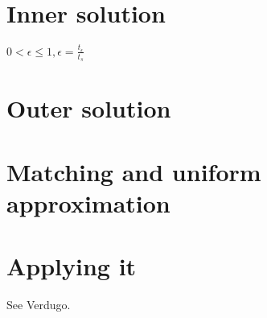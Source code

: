 \documentclass[12pt]{report}
\begin{document}
\section{Inner solution}

$0 < \epsilon \leq 1, \epsilon = \frac{t_{\epsilon}}{t_{s}}$

\section{Outer solution}

\section{Matching and uniform approximation}

\section{Applying it}

See Verdugo.


\end{document}
